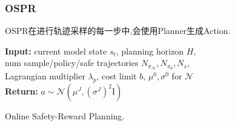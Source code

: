 \documentclass[10pt,mathserif]{beamer}%
\begin{document}
\begin{frame}[t, fragile]
	\frametitle{OSPR}
	\begin{minipage}[t]{0.40\linewidth}
	OSPR在进行轨迹采样的每一步中,会使用Planner生成Action.
	\end{minipage}\hfill
	\begin{minipage}[t]{0.60\linewidth}
	\begin{algorithm}[H]
	\SetAlCapNameFnt{\fontsize{8pt}{9.6pt}\selectfont} 
	\SetAlCapFnt{\fontsize{8pt}{9.6pt}\selectfont}
	\fontsize{8pt}{9.6pt}\selectfont
	\DontPrintSemicolon
	\SetNoFillComment
	\SetAlgoLined
	\textbf{Input:} current model state $s_{t}$, planning horizon $H$,\\
	num sample/policy/safe trajectories $N_{\pi_\mathcal{N}}, N_{\pi_\theta}, N_{s}$,\\
	Lagrangian multiplier $\lambda_p$, cost limit $b$, $\mu^{0}, \sigma^{0}$ for $\mathcal{N}$\\
	\textbf{Return: } $a \sim \mathcal{N}(\mu^{J}, (\sigma^{J})^{2} \mathrm{I})$
	\caption{Online Safety-Reward Planning.}
	\label{alg:planning}
	\end{algorithm}
	\end{minipage}
	\end{frame}
\end{document}
